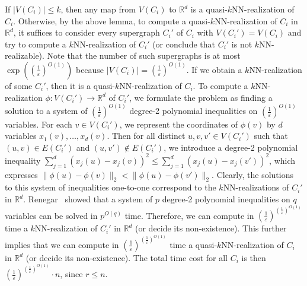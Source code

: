If $|V(C_i)| \leq k$, then any map from $V(C_i)$ to $\mathbb{R}^d$ is a quasi-$k$NN-realization of $C_i$.
Otherwise, by the above lemma, to compute a quasi-$k$NN-realization of $C_i$ in $\mathbb{R}^d$, it suffices to consider every supergraph $C_i'$ of $C_i$ with $V(C_i') = V(C_i)$ and try to compute a $k$NN-realization of $C_i'$ (or conclude that $C_i'$ is not $k$NN-realizable).
Note that the number of such supergraphs is at most $\exp({(\frac{1}{\varepsilon})^{O(1)}})$ because $|V(C_i)| = (\frac{1}{\varepsilon})^{O(1)}$.
If we obtain a $k$NN-realization of some $C_i'$, then it is a quasi-$k$NN-realization of $C_i$.
To compute a $k$NN-realization $\phi:V(C_i') \rightarrow \mathbb{R}^d$ of $C_i'$, we formulate the problem as finding a solution to a system of $(\frac{1}{\varepsilon})^{O(1)}$ degree-2 polynomial inequalities on $(\frac{1}{\varepsilon})^{O(1)}$ variables.
For each $v \in V(C_i')$, we represent the coordinates of $\phi(v)$ by $d$ variables $x_1(v),\dots,x_d(v)$.
Then for all distinct $u,v,v' \in V(C_i')$ such that $(u,v) \in E(C_i')$ and $(u,v') \notin E(C_i')$, we introduce a degree-2 polynomial inequality $\sum_{j=1}^d (x_j(u)-x_j(v))^2 \leq \sum_{j=1}^d (x_j(u)-x_j(v'))^2$, which expresses $\lVert \phi(u) - \phi(v) \rVert_2 < \lVert \phi(u) - \phi(v') \rVert_2$.
Clearly, the solutions to this system of inequalities one-to-one correspond to the $k$NN-realizations of $C_i'$ in $\mathbb{R}^d$.
Renegar~\cite{renegar:1992} showed that a system of $p$ degree-2 polynomial inequalities on $q$ variables can be solved in $p^{O(q)}$ time.
Therefore, we can compute in $(\frac{1}{\varepsilon})^{(\frac{1}{\varepsilon})^{O(1)}}$ time a $k$NN-realization of $C_i'$ in $\mathbb{R}^d$ (or decide its non-existence).
This further implies that we can compute in $(\frac{1}{\varepsilon})^{(\frac{1}{\varepsilon})^{O(1)}}$ time a quasi-$k$NN-realization of $C_i$ in $\mathbb{R}^d$ (or decide its non-existence).
The total time cost for all $C_i$ is then $(\frac{1}{\varepsilon})^{(\frac{1}{\varepsilon})^{O(1)}} \cdot n$, since $r \leq n$.

